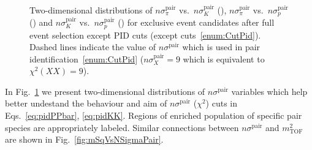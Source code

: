 \begin{figure}[h]
{  \begin{subfigure}[b]{\linewidth}\addtocounter{subfigure}{-2}\vspace*{-13pt}
  \end{subfigure}\\
  \begin{minipage}[t][1.042\linewidth][t]{\linewidth}\vspace{10pt}
    \caption[$n\sigma^{\text{pair}}_{X}$ vs. $n\sigma^{\text{pair}}_{Y}$.]{Two-dimensional distributions of $n\sigma^{\text{pair}}_{\pi}$ vs.~$n\sigma^{\text{pair}}_{K}$ (), $n\sigma^{\text{pair}}_{\pi}$ vs.~$n\sigma^{\text{pair}}_{p}$  () and $n\sigma^{\text{pair}}_{K}$ vs.~$n\sigma^{\text{pair}}_{p}$  () for exclusive event candidates after full event selection except PID cuts (except cuts~\ref{enum:CutPid}). Dashed lines indicate the value of $n\sigma^{\text{pair}}$ which is used in pair identification~\ref{enum:CutPid} ($n\sigma^{\text{pair}}_{X}=9$ which is equivalent to $\chi^{2}(XX)=9$).}\label{fig:SqRootNSigma2D}
  \end{minipage}
}%

\end{figure}


In Fig.~\ref{fig:SqRootNSigma2D} we present two-dimensional distributions of $n\sigma^{\text{pair}}$ variables which help better undestand the behaviour and aim of $n\sigma^{\text{pair}}$ ($\chi^{2}$) cuts in Eqs.~\eqref{eq:pidPPbar}, \eqref{eq:pidKK}. Regions of enriched population of specific pair species are appropriately labeled. Similar connections between $n\sigma^{\text{pair}}$ and $m^{2}_{\text{TOF}}$ are shown in Fig.~\ref{fig:mSqVsNSigmaPair}.
 

